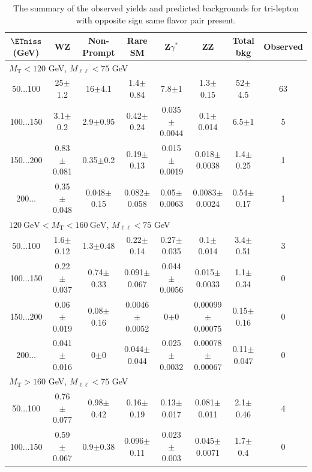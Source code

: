\begin{landscape}
\begin{table}
\begin{center}
\caption{\label{tab:OSSF1tau0} The summary of the observed yields and predicted backgrounds for tri-lepton 
with opposite sign same flavor pair present. }
\begin{tabular}{| c | c c c c c c c | }\hline\hline
$\ETmiss$ (GeV) & WZ & Non-Prompt & Rare SM & Z$\gamma^*$ & ZZ & Total bkg & Observed\\\hline\hline
\multicolumn{8}{l}{$M_{\text{T}} < 120$ GeV, $M_{\ell\ell} < 75$ GeV}\\\hline\hline
50$\dots$100&25$\pm$1.2&16$\pm$4.1&1.4$\pm$0.84&7.8$\pm$1&1.3$\pm$0.15&52$\pm$4.5&63\\
100$\dots$150&3.1$\pm$0.2&2.9$\pm$0.95&0.42$\pm$0.24&0.035$\pm$0.0044&0.1$\pm$0.014&6.5$\pm$1&5\\
150$\dots$200&0.83$\pm$0.081&0.35$\pm$0.2&0.19$\pm$0.13&0.015$\pm$0.0019&0.018$\pm$0.0038&1.4$\pm$0.25&1\\
200$\dots$&0.35$\pm$0.048&0.048$\pm$0.15&0.082$\pm$0.058&0.05$\pm$0.0063&0.0083$\pm$0.0024&0.54$\pm$0.17&1\\
\hline\hline
\multicolumn{8}{l}{$120~\mathrm{GeV} < M_{\text{T}} < 160~\mathrm{GeV}$, $M_{\ell\ell} < 75$ GeV}\\\hline\hline
50$\dots$100&1.6$\pm$0.12&1.3$\pm$0.48&0.22$\pm$0.14&0.27$\pm$0.035&0.1$\pm$0.014&3.4$\pm$0.51&3\\
100$\dots$150&0.22$\pm$0.037&0.74$\pm$0.33&0.091$\pm$0.067&0.044$\pm$0.0056&0.015$\pm$0.0033&1.1$\pm$0.34&0\\
150$\dots$200&0.06$\pm$0.019&0.08$\pm$0.16&0.0046$\pm$0.0052&0$\pm$0&0.00099$\pm$0.00075&0.15$\pm$0.16&0\\
200$\dots$&0.041$\pm$0.016&0$\pm$0&0.044$\pm$0.044&0.025$\pm$0.0032&0.00078$\pm$0.00067&0.11$\pm$0.047&0\\
\hline\hline
\multicolumn{8}{l}{$M_{\text{T}} > 160$ GeV, $M_{\ell\ell} < 75$ GeV}\\\hline\hline
50$\dots$100&0.76$\pm$0.077&0.98$\pm$0.42&0.16$\pm$0.19&0.13$\pm$0.017&0.081$\pm$0.011&2.1$\pm$0.46&4\\
100$\dots$150&0.59$\pm$0.067&0.9$\pm$0.38&0.096$\pm$0.11&0.023$\pm$0.003&0.045$\pm$0.0071&1.7$\pm$0.4&0\\

\end{tabular}
\end{center}
\end{table}
\end{landscape}
